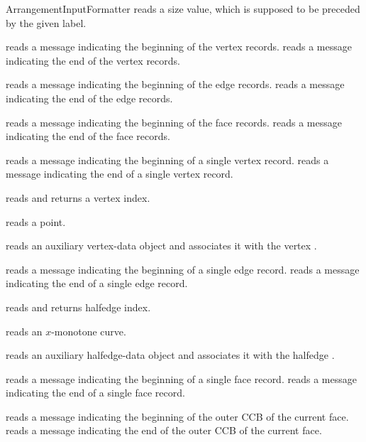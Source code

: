 \begin{ccRefConcept}{ArrangementInputFormatter}
    {reads a size value, which is supposed to be preceded by the given label.}

    {reads a message indicating the beginning of the vertex records.}
\ccGlue
{}
    {reads a message indicating the end of the vertex records.}

    {reads a message indicating the beginning of the edge records.}
\ccGlue
{}
    {reads a message indicating the end of the edge records.}

    {reads a message indicating the beginning of the face records.}
\ccGlue
{}
    {reads a message indicating the end of the face records.}

    {reads a message indicating the beginning of a single vertex record.}
\ccGlue
{}
    {reads a message indicating the end of a single vertex record.}

    {reads and returns a vertex index.}

    {reads a point.}

    {reads an auxiliary vertex-data object and associates it with the vertex .}

    {reads a message indicating the beginning of a single edge record.}
\ccGlue
{}
    {reads a message indicating the end of a single edge record.}

    {reads and returns halfedge index.}

    {reads an $x$-monotone curve.}

    {reads an auxiliary halfedge-data object and associates it with the halfedge .}

    {reads a message indicating the beginning of a single face record.}
\ccGlue
{}
    {reads a message indicating the end of a single face record.}

    {reads a message indicating the beginning of the outer CCB of the current face.}
\ccGlue
{}
    {reads a message indicating the end of the outer CCB of the current face.}


\end{ccRefConcept}
